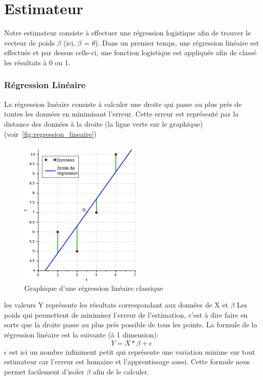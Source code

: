 \section{Estimateur}

Notre estimateur consiste à effectuer une régression logistique afin de trouver le vecteur de poids $\beta$ (ici, $\beta$ = $\theta$). Dans un premier temps, une régression linéaire est effectuée et par dessus celle-ci, une fonction logistique est appliquée afin de classé les résultats à 0 ou 1. 

\subsubsection{Régression Linéaire}

La régression linéaire consiste à calculer une droite qui passe au plus prés de toutes les données en minimisant l'erreur. Cette erreur est représenté par la distance des données à la droite (la ligne verte sur le graphique)  (voir~\autoref{fig:regression_lineaire})

\begin{figure}[htpb]
	\centering
	\includegraphics[scale = 0.5]{images/regression_lineaire}
	\caption{Graphique d'une régression linéaire classique}
	\label{fig:regression_lineaire}
\end{figure}
 
les valeurs Y représente les résultats correspondant aux données de X et $\beta$ Les poids qui permettent de minimiser l'erreur de l'estimation, c'est à dire faire en sorte que la droite passe au plus prés possible de tous les points. 
La formule de la régression linéaire est la suivante (à 1 dimension): 
\begin{equation}
Y = X * \beta + \epsilon
\end{equation}
$\epsilon$ est ici un nombre infiniment petit qui représente une variation minime sur tout estimateur car l'erreur est humaine et l'apprentissage aussi. 
Cette formule nous permet facilement d'isoler $\beta$ afin de le calculer. 

